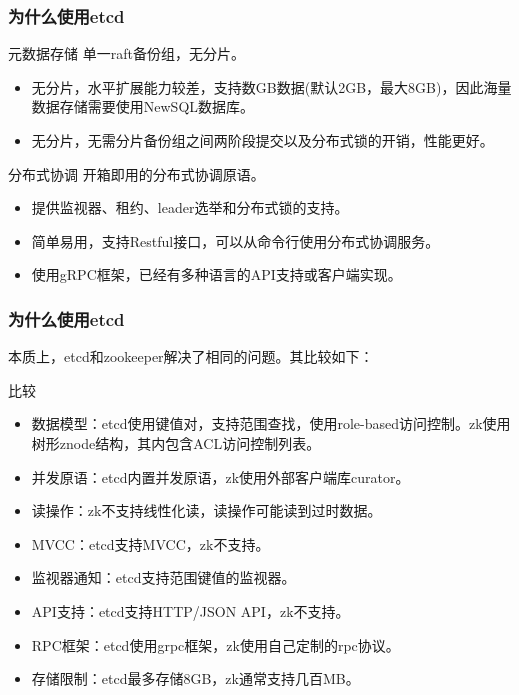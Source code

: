 \documentclass{beamer}
\begin{document}
%
%
\begin{frame}
\frametitle{为什么使用etcd}

\begin{exampleblock}{元数据存储}
单一raft备份组，无分片。
\begin{itemize}
    \item 无分片，水平扩展能力较差，支持数GB数据(默认2GB，最大8GB)，因此海量数据存储需要使用NewSQL数据库。
    \item 无分片，无需分片备份组之间两阶段提交以及分布式锁的开销，性能更好。
\end{itemize}
\end{exampleblock}

\begin{exampleblock}{分布式协调}
开箱即用的分布式协调原语。
\begin{itemize}
    \item 提供监视器、租约、leader选举和分布式锁的支持。
    \item 简单易用，支持Restful接口，可以从命令行使用分布式协调服务。
    \item 使用gRPC框架，已经有多种语言的API支持或客户端实现。
\end{itemize}
\end{exampleblock}

\end{frame}

%
%
\begin{frame}
\frametitle{为什么使用etcd}

本质上，etcd和zookeeper解决了相同的问题。其比较如下：

\begin{alertblock}{比较}
    \begin{itemize}
        \item 数据模型：etcd使用键值对，支持范围查找，使用role-based访问控制。zk使用树形znode结构，其内包含ACL访问控制列表。
        \item 并发原语：etcd内置并发原语，zk使用外部客户端库curator。
        \item 读操作：zk不支持线性化读，读操作可能读到过时数据。
        \item MVCC：etcd支持MVCC，zk不支持。
        \item 监视器通知：etcd支持范围键值的监视器。
        \item API支持：etcd支持HTTP/JSON API，zk不支持。
        \item RPC框架：etcd使用grpc框架，zk使用自己定制的rpc协议。
        \item 存储限制：etcd最多存储8GB，zk通常支持几百MB。
    \end{itemize}
\end{alertblock}

\end{frame}
\end{document}

